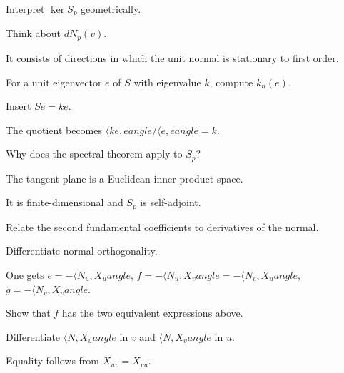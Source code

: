 \begin{exercise}\label{exr:vii16-18}
Interpret \(\ker S_p\) geometrically.
\end{exercise}
\begin{hint}
Think about \(dN_p(v)\).
\end{hint}
\begin{solution}
It consists of directions in which the unit normal is stationary to first order.
\end{solution}

\begin{exercise}\label{exr:vii16-19}
For a unit eigenvector \(e\) of \(S\) with eigenvalue \(k\), compute \(k_n(e)\).
\end{exercise}
\begin{hint}
Insert \(Se=ke\).
\end{hint}
\begin{solution}
The quotient becomes \(\langle ke,e
angle/\langle e,e
angle=k\).
\end{solution}

\begin{exercise}\label{exr:vii16-20}
Why does the spectral theorem apply to \(S_p\)?
\end{exercise}
\begin{hint}
The tangent plane is a Euclidean inner-product space.
\end{hint}
\begin{solution}
It is finite-dimensional and \(S_p\) is self-adjoint.
\end{solution}

\begin{exercise}\label{exr:vii16-21}
Relate the second fundamental coefficients to derivatives of the normal.
\end{exercise}
\begin{hint}
Differentiate normal orthogonality.
\end{hint}
\begin{solution}
One gets \(e=-\langle N_u,X_u
angle\), \(f=-\langle N_u,X_v
angle=-\langle N_v,X_u
angle\), \(g=-\langle N_v,X_v
angle\).
\end{solution}

\begin{exercise}\label{exr:vii16-22}
Show that \(f\) has the two equivalent expressions above.
\end{exercise}
\begin{hint}
Differentiate \(\langle N,X_u
angle\) in \(v\) and \(\langle N,X_v
angle\) in \(u\).
\end{hint}
\begin{solution}
Equality follows from \(X_{uv}=X_{vu}\).
\end{solution}

